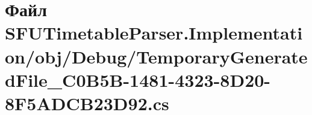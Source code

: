 \hypertarget{_s_f_u_timetable_parser_8_implementation_2obj_2_debug_2_temporary_generated_file__036_c0_b5_b-140d4c3ef9cf297680cc847524623dcf28}{}\section{Файл S\+F\+U\+Timetable\+Parser.\+Implementation/obj/\+Debug/\+Temporary\+Generated\+File\+\_\+C0\+B5\+B-\/1481-\/4323-\/8\+D20-\/8\+F5\+A\+D\+C\+B23\+D92.cs}
\label{_s_f_u_timetable_parser_8_implementation_2obj_2_debug_2_temporary_generated_file__036_c0_b5_b-140d4c3ef9cf297680cc847524623dcf28}
